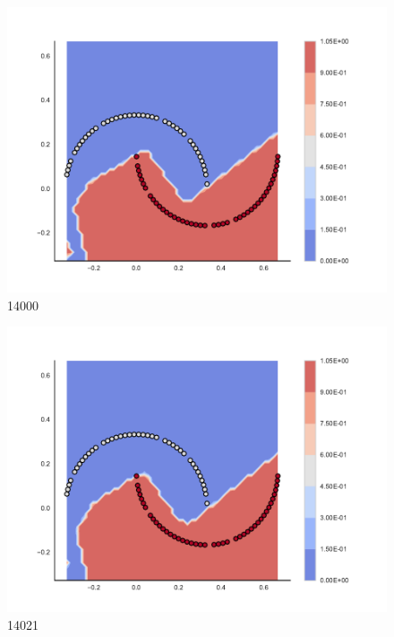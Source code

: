 \begin{subfigure}[b]{0.09\textwidth}
    \includegraphics[width=\textwidth]{img/convergence/14000.pdf}
    \caption{14000}
    \label{fig:convergence_14000}
\end{subfigure}
%
\begin{subfigure}[b]{0.09\textwidth}
    \includegraphics[width=\textwidth]{img/convergence/14021.pdf}
    \caption{14021}
    \label{fig:convergence_14021}
\end{subfigure}
%
